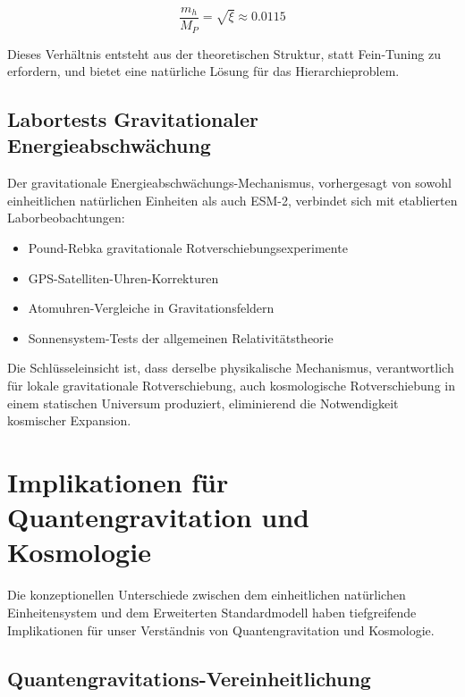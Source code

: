 \documentclass[12pt,a4paper]{article}
\newcommand{\xipar}{\xi}
\begin{document}
	\begin{equation}
		\frac{m_h}{M_P} = \sqrt{\xipar} \approx 0.0115
	\end{equation}
	
	Dieses Verhältnis entsteht aus der theoretischen Struktur, statt Fein-Tuning zu erfordern, und bietet eine natürliche Lösung für das Hierarchieproblem.
	
	\subsection{Labortests Gravitationaler Energieabschwächung}
	\label{subsec:laboratory_tests}
	
	Der gravitationale Energieabschwächungs-Mechanismus, vorhergesagt von sowohl einheitlichen natürlichen Einheiten als auch ESM-2, verbindet sich mit etablierten Laborbeobachtungen:
	
	\begin{itemize}
		\item Pound-Rebka gravitationale Rotverschiebungsexperimente
		\item GPS-Satelliten-Uhren-Korrekturen
		\item Atomuhren-Vergleiche in Gravitationsfeldern
		\item Sonnensystem-Tests der allgemeinen Relativitätstheorie
	\end{itemize}
	
	Die Schlüsseleinsicht ist, dass derselbe physikalische Mechanismus, verantwortlich für lokale gravitationale Rotverschiebung, auch kosmologische Rotverschiebung in einem statischen Universum produziert, eliminierend die Notwendigkeit kosmischer Expansion.
	
	\section{Implikationen für Quantengravitation und Kosmologie}
	\label{sec:implications}
	
	Die konzeptionellen Unterschiede zwischen dem einheitlichen natürlichen Einheitensystem und dem Erweiterten Standardmodell haben tiefgreifende Implikationen für unser Verständnis von Quantengravitation und Kosmologie.
	
	\subsection{Quantengravitations-Vereinheitlichung}
	\label{subsec:quantum_gravity_unification}
	
\end{document}
